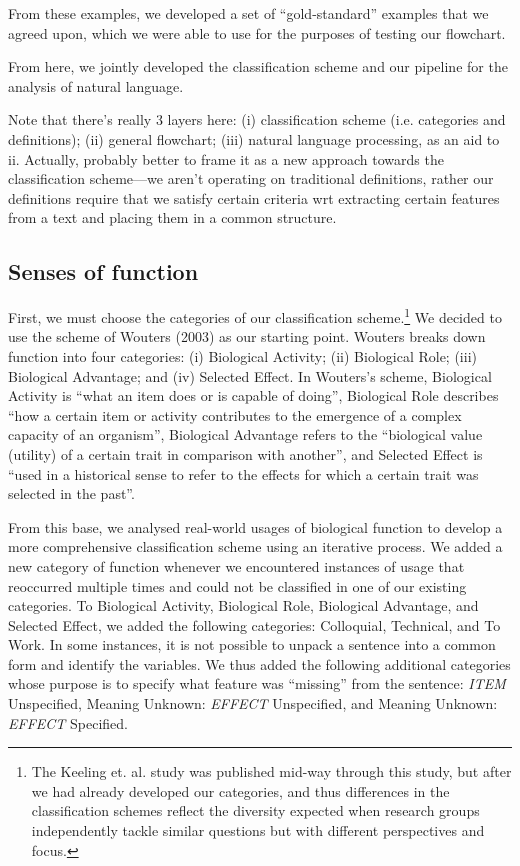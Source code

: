 \documentclass{article}
\begin{document}
From these examples, we developed a set of ``gold-standard'' examples that we agreed upon, which we were able to use for the purposes of testing our flowchart.

From here, we jointly developed the classification scheme and our pipeline for the analysis of natural language.

Note that there's really 3 layers here: (i) classification scheme (i.e. categories and definitions); (ii) general flowchart; (iii) natural language processing, as an aid to ii.
Actually, probably better to frame it as a new approach towards the classification scheme---we aren't operating on traditional definitions, rather our definitions require that we satisfy certain criteria wrt extracting certain features from a text and placing them in a common structure.

\subsection{Senses of function}
\label{sec:senses-function}

First, we must choose the categories of our classification scheme.\footnote{The Keeling et. al. study was published mid-way through this study, but after we had already developed our categories, and thus differences in the classification schemes reflect the diversity expected when research groups independently tackle similar questions but with different perspectives and focus.}
We decided to use the scheme of Wouters (2003) as our starting point.
Wouters breaks down function into four categories: (i) Biological Activity; (ii) Biological Role; (iii) Biological Advantage; and (iv) Selected Effect.
In Wouters's scheme, Biological Activity is ``what an item does or is capable of doing'', Biological Role describes ``how a certain item or activity contributes to the emergence of a complex capacity of an organism'', Biological Advantage refers to the ``biological value (utility) of a certain trait in comparison with another'', and Selected Effect is ``used in a historical sense to refer to the effects for which a certain trait was selected in the past''.

From this base, we analysed real-world usages of biological function to develop a more comprehensive classification scheme using an iterative process.
We added a new category of function whenever we encountered instances of usage that reoccurred multiple times and could not be classified in one of our existing categories.
To Biological Activity, Biological Role, Biological Advantage, and Selected Effect, we added the following categories: Colloquial, Technical, and To Work.
In some instances, it is not possible to unpack a sentence into a common form and identify the variables.
We thus added the following additional categories whose purpose is to specify what feature was ``missing'' from the sentence: \emph{ITEM} Unspecified, Meaning Unknown: \emph{EFFECT} Unspecified, and Meaning Unknown: \emph{EFFECT} Specified.
\end{document}
